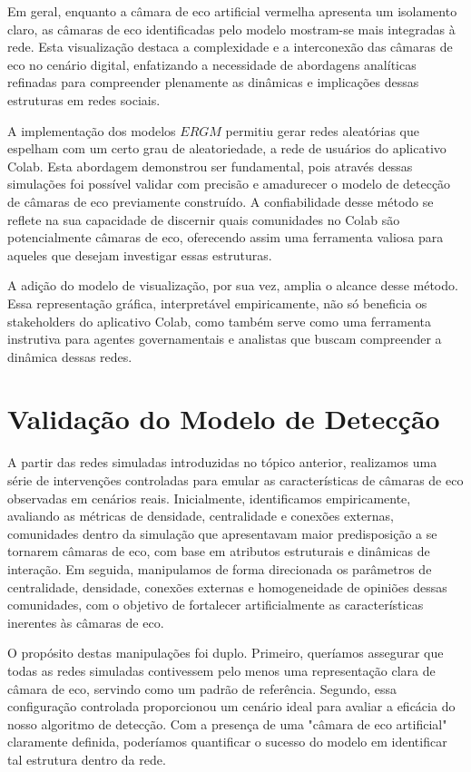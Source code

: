 Em geral, enquanto a câmara de eco artificial vermelha apresenta um isolamento claro, as câmaras de eco identificadas pelo modelo mostram-se mais integradas à rede. Esta visualização destaca a complexidade e a interconexão das câmaras de eco no cenário digital, enfatizando a necessidade de abordagens analíticas refinadas para compreender plenamente as dinâmicas e implicações dessas estruturas em redes sociais.

A implementação dos modelos $ERGM$ permitiu gerar redes aleatórias que espelham com um certo grau de aleatoriedade, a rede de usuários do aplicativo Colab. Esta abordagem demonstrou ser fundamental, pois através dessas simulações foi possível validar com precisão e amadurecer o modelo de detecção de câmaras de eco previamente construído. A confiabilidade desse método se reflete na sua capacidade de discernir quais comunidades no Colab são potencialmente câmaras de eco, oferecendo assim uma ferramenta valiosa para aqueles que desejam investigar essas estruturas.

A adição do modelo de visualização, por sua vez, amplia o alcance desse método. Essa representação gráfica, interpretável empiricamente, não só beneficia os stakeholders do aplicativo Colab, como também serve como uma ferramenta instrutiva para agentes governamentais e analistas que buscam compreender a dinâmica dessas redes.

\section{Validação do Modelo de Detecção}

A partir das redes simuladas introduzidas no tópico anterior, realizamos uma série de intervenções controladas para emular as características de câmaras de eco observadas em cenários reais. Inicialmente, identificamos empiricamente, avaliando as métricas de densidade, centralidade e conexões externas, comunidades dentro da simulação que apresentavam maior predisposição a se tornarem câmaras de eco, com base em atributos estruturais e dinâmicas de interação. Em seguida, manipulamos de forma direcionada os parâmetros de centralidade, densidade, conexões externas e homogeneidade de opiniões dessas comunidades, com o objetivo de fortalecer artificialmente as características inerentes às câmaras de eco.

O propósito destas manipulações foi duplo. Primeiro, queríamos assegurar que todas as redes simuladas contivessem pelo menos uma representação clara de câmara de eco, servindo como um padrão de referência. Segundo, essa configuração controlada proporcionou um cenário ideal para avaliar a eficácia do nosso algoritmo de detecção. Com a presença de uma "câmara de eco artificial" claramente definida, poderíamos quantificar o sucesso do modelo em identificar tal estrutura dentro da rede.

